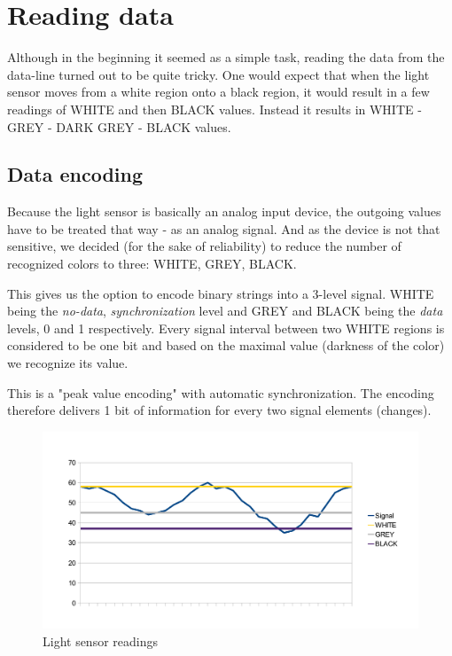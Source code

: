 \section{Reading data}
Although in the beginning it seemed as a simple task, reading the data
from the data-line turned out to be quite tricky. One would expect that
when the light sensor moves from a white region onto a black region,
it would result in a few readings of WHITE and then BLACK values. Instead
it results in WHITE - GREY - DARK GREY - BLACK values.

\subsection{Data encoding}
Because the light sensor is basically an analog input device, the outgoing
values have to be treated that way - as an analog signal. And as the device
is not that sensitive, we decided (for the sake of reliability) to reduce
the number of recognized colors to three: WHITE, GREY, BLACK.

This gives us the option to encode binary strings into a 3-level signal.
WHITE being the \textit{no-data}, \textit{synchronization} level and GREY
and BLACK being the \textit{data} levels, 0 and 1 respectively. Every
signal interval between two WHITE regions is considered to be one bit and
based on the maximal value (darkness of the color) we recognize its value.

This is a "peak value encoding" with automatic synchronization.
The encoding therefore delivers 1 bit of information for every two signal
elements (changes).

\begin{figure}[h]
\includegraphics[width=1.0\linewidth]{light_signal.pdf}
\caption{Light sensor readings}
\end{figure}

